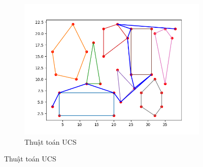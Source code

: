 \documentclass[a4paper, 11pt]{article}
\begin{document}
\begin{figure}[h]
\begin{subfigure}{.3\linewidth}
      \includegraphics[width=\textwidth,height=\textheight,keepaspectratio]{ucs.png}
      \caption{Thuật toán UCS}
  \end{subfigure}
  

\end{figure}
\end{document}
